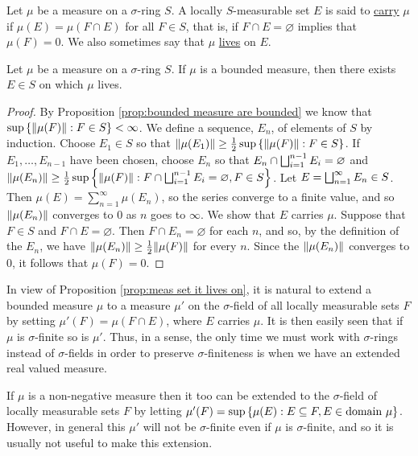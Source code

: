 \begin{definition}
Let $\mu$ be a measure on a $\sigma$-ring $S$. A locally $S$-measurable set $E$ is said to \underline{carry} $\mu$ if $\mu(E)=\mu(F\cap E)$ for all $F\in S$, that is, if $F\cap E=\varnothing$ implies that $\mu(F)=0$. We also sometimes say that $\mu$ \underline{lives} on $E$.
\end{definition}

\begin{proposition}
\label{prop:meas set it lives on}
Let $\mu$ be a measure on a $\sigma$-ring $S$. If $\mu$ is a bounded measure, then there exists $E \in S$ on which $\mu$ lives.
\end{proposition}

\begin{proof}
By Proposition \ref{prop:bounded measure are bounded} we know that $\sup\left\{\norm{\mu(F)}: F\in S\right\}<\infty$. We define a sequence, $E_n$, of elements of $S$ by induction. Choose $E_1 \in S$ so that $\norm{\mu(E_1)}\geq\frac12 \sup\left\{\norm{\mu(F)}: F\in S\right\}$. If $E_1,\dots,E_{n-1}$ have been chosen, choose $E_{n}$ so that $E_n \cap \bigsqcup_{i=1}^{n-1}E_{i}=\varnothing$ and $\norm{\mu(E_n)}\geq \frac12\sup\left\{\norm{\mu(F)}: F\cap\bigsqcup_{i=1}^{n-1}E_i=\varnothing,F\in S\right\}$. Let $E=\bigsqcup_{n=1}^{\infty} E_n \in S$. Then $\mu(E)=\sum_{n=1}^{\infty} \mu(E_{n})$, so the series converge to a finite value, and so $\norm{\mu(E_n)}$ converges to $0$ as $n$ goes to $\infty$. We show that $E$ carries $\mu$. Suppose that $F\in S$ and $F\cap E=\varnothing$. Then $F\cap E_n=\varnothing$ for each $n$, and so, by the definition of the $E_n$, we have $\norm{\mu(E_n)}\geq\frac12\norm{\mu(F)}$ for every $n$. Since the $\norm{\mu(E_n)}$ converges to $0$, it follows that $\mu(F)=0$.
\end{proof}

In view of Proposition \ref{prop:meas set it lives on}, it is natural to extend a bounded measure $\mu$ to a measure $\mu'$ on the $\sigma$-field of all locally measurable sets $F$ by setting $\mu'(F)=\mu(F\cap E)$, where $E$ carries $\mu$. It is then easily seen that if $\mu$ is $\sigma$-finite so is $\mu'$. Thus, in a sense, the only time we must work with $\sigma$-rings instead of $\sigma$-fields in order to preserve $\sigma$-finiteness is when we have an extended real valued measure.

If $\mu$ is a non-negative measure then it too can be extended to the $\sigma$-field of locally measurable sets $F$ by letting $\mu'(F)=\sup\left\{\mu(E):E\subseteq F,E\in\text{domain }\mu\right\}$. However, in general this $\mu'$ will not be $\sigma$-finite even if $\mu$ is $\sigma$-finite, and so it is usually not useful to make this extension. 

